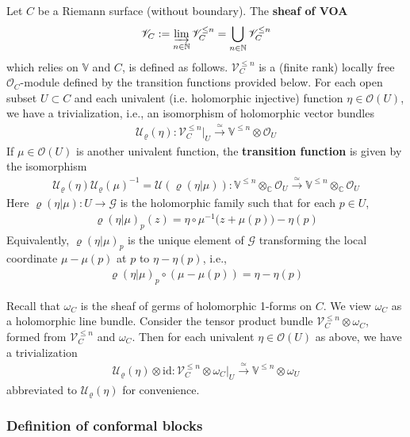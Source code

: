 \documentclass[11pt,b5paper,notitlepage]{article}
\theoremstyle{definition}
\theoremstyle{plain}
\newcommand{\SV}{\mathscr{V}}
\newcommand{\scr}{\mathscr}
\newcommand{\Vbb}{\mathbb V}
\newcommand{\Cbb}{\mathbb C}
\newcommand{\Nbb}{\mathbb N}
\newcommand{\<}{\left\langle}
\renewcommand{\>}{\right\rangle}
\newcommand{\MO}{\mathcal{O}}
\newcommand{\MU}{\mathcal{U}}
\newcommand{\MG}{\mathcal G}
\newcommand{\id}{\mathrm{id}}
\numberwithin{equation}{section}
\begin{document}
Let $C$ be a Riemann surface (without boundary). The \textbf{sheaf of VOA} 
	 \begin{align*}
		\scr V_C:=\varinjlim_{n\in\Nbb}\scr V_C^{\leq n}=\bigcup_{n\in\Nbb}\scr V_C^{\leq n}
	 \end{align*}
which relies on $\Vbb$ and $C$, is defined as follows.  $\SV_C^{\leq n}$ is a (finite rank) locally free $\MO_C$-module defined by the transition functions provided below. For each open subset $U\subset C$ and each univalent (i.e. holomorphic injective) function $\eta\in \MO(U)$, we have a trivialization, i.e., an isomorphism of holomorphic vector bundles
	 \begin{align*}
		\MU_\varrho(\eta):\SV_C^{\leq n}|_U\xrightarrow{\simeq} \Vbb^{\leq n}\otimes \MO_U
	 \end{align*}
	 If $\mu\in \MO(U)$ is another univalent function, the \textbf{transition function} is given by the isomorphism
	 \begin{align}\label{eq109}
		\MU_\varrho(\eta)\MU_\varrho(\mu)^{-1}=\MU(\varrho(\eta|\mu)):\Vbb^{\leq n}\otimes_\Cbb \MO_U \xrightarrow{\simeq} \Vbb^{\leq n}\otimes_\Cbb \MO_U
	 \end{align}
	 Here $\varrho(\eta|\mu):U\rightarrow \mathcal G$ is the holomorphic family such that for each $p\in U$, 
	 \begin{align*}
    \varrho(\eta|\mu)_p(z)=\eta\circ\mu^{-1}\big(z+\mu(p)\big)-\eta(p)
	 \end{align*}
Equivalently, $\varrho(\eta|\mu)_p$ is the unique element of $\MG$ transforming the local coordinate $\mu-\mu(p)$ at $p$ to $\eta-\eta(p)$, i.e.,
\begin{align*}
\varrho(\eta|\mu)_p\circ(\mu-\mu(p))=\eta-\eta(p)
\end{align*}


Recall that $\omega_C$ is the sheaf of germs of holomorphic 1-forms on $C$. We view $\omega_C$ as a holomorphic line bundle. Consider the tensor product bundle $\SV_C^{\leq n}\otimes\omega_C$, formed from $\SV_C^{\leq n}$ and $\omega_C$. Then for each univalent $\eta\in\MO(U)$ as above, we have a trivialization
\begin{align*}
\MU_\varrho(\eta)\otimes \id:\SV_C^{\leq n}\otimes\omega_C|_U\xrightarrow{\simeq} \Vbb^{\leq n}\otimes \omega_U
\end{align*}
abbreviated to $\MU_\varrho(\eta)$ for convenience.






\subsubsection{Definition of conformal blocks}
\end{document}
